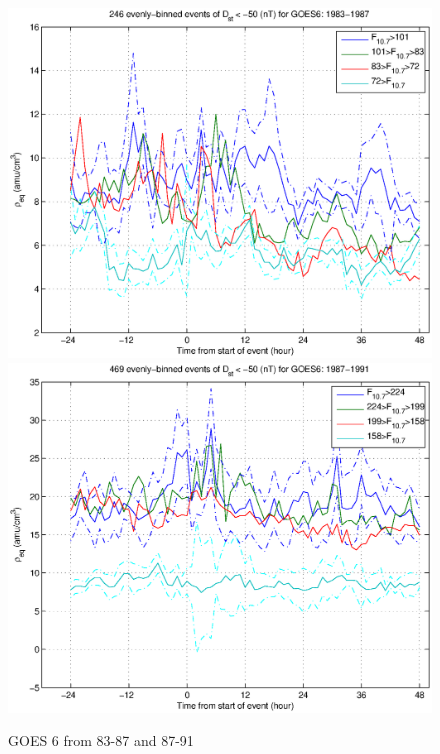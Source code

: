 \documentclass[10pt,twocolumn]{article}
\begin{document}
\begin{figure}[htp!]
\includegraphics[scale=0.45]{paperfigures/HighLowF107rhoeq-Dst50-GOES6-1983-1987.eps}
\includegraphics[scale=0.45]{paperfigures/HighLowF107rhoeq-Dst50-GOES6-1987-1991.eps}
\caption{GOES 6 from 83-87 and 87-91}
\end{figure}
\clearpage
\end{document}
